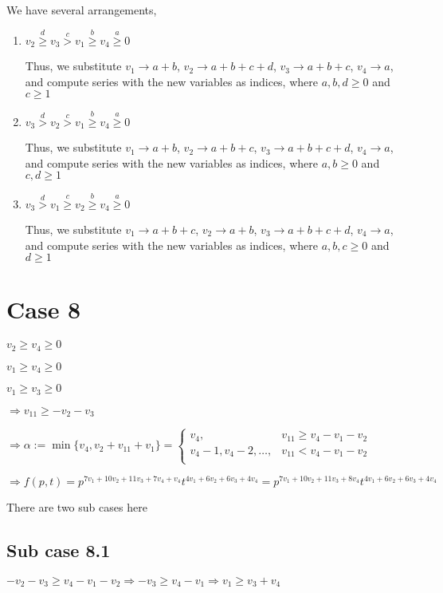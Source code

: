 \documentclass{article}
\begin{document}
We have several arrangements,
\begin{enumerate}
    \item 
$v_2\overset{d}{\geq}v_3\overset{c}{>}v_1\overset{b}{\geq}{v_4}\overset{a}{\geq}{0}$

Thus, we substitute $v_1\rightarrow{a+b}$, $v_2\rightarrow{a+b+c+d}$, $v_3\rightarrow{a+b+c}$, $v_4\rightarrow{a}$, and compute series with the new variables as indices, where $a,b,d\geq{0}$ and $c\geq{1}$    
\item 
$v_3\overset{d}{>}v_2\overset{c}{>}v_1\overset{b}{\geq}{v_4}\overset{a}{\geq}{0}$

Thus, we substitute $v_1\rightarrow{a+b}$, $v_2\rightarrow{a+b+c}$, $v_3\rightarrow{a+b+c+d}$, $v_4\rightarrow{a}$, and compute series with the new variables as indices, where $a,b\geq{0}$ and $c,d\geq{1}$
    \item 
$v_3\overset{d}{>}v_1\overset{c}{\geq}v_2\overset{b}{\geq}{v_4}\overset{a}{\geq}{0}$

Thus, we substitute $v_1\rightarrow{a+b+c}$, $v_2\rightarrow{a+b}$, $v_3\rightarrow{a+b+c+d}$, $v_4\rightarrow{a}$, and compute series with the new variables as indices, where $a,b,c\geq{0}$ and $d\geq{1}$

\end{enumerate}
\section{Case 8}
$v_2\geq{v_4}\geq{0}$

$v_1\geq{v_4}\geq{0}$

$v_1\geq{v_3}\geq{0}$

$\Rightarrow{v_{11}}\geq{-v_2-v_3}$

$\Rightarrow\alpha:=\min\{v_4,v_2+v_{11}+v_1\}=\begin{cases}
       v_4, & v_{11}\geq{v_4-v_1-v_2}\\
       v_4-1,v_4-2,\dots, & v_{11}<{v_4-v_1-v_2}\\
     \end{cases}$

     $\Rightarrow{f(p,t)=p^{7v_1+10v_2+11v_3+7v_4+v_4}t^{4v_1+6v_2+6v_3+4v_4}=p^{7v_1+10v_2+11v_3+8v_4}t^{4v_1+6v_2+6v_3+4v_4}}$

There are two sub cases here
\subsection{Sub case 8.1}
$-v_2-v_3\geq{v_4-v_1-v_2}\Rightarrow{-v_3\geq{v_4-v_1}}\Rightarrow{v_1\geq{v_3+v_4}}$
\end{document}

